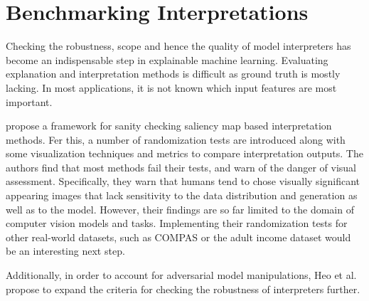 \section{Benchmarking Interpretations}
\label{sec:benchmarking}

Checking the robustness, scope and hence the quality of model interpreters has become an indispensable step in explainable machine learning. 
Evaluating explanation and interpretation methods is difficult as ground truth is mostly lacking. In most applications, it is not known which input features are most important. 


\cite{adebayo2018sanity} propose a framework for sanity checking saliency map based interpretation methods. Fer this, a number of randomization tests are introduced along with some visualization techniques and metrics to compare interpretation outputs. The authors find that most methods fail their tests, and warn of the danger of visual assessment. Specifically, they warn that humans tend to chose visually significant appearing images that lack sensitivity to the data distribution and generation as well as to the model. 
However, their findings are so far limited to the domain of computer vision models and tasks. %
Implementing their randomization tests for other real-world datasets, such as COMPAS \cite{compas_dataset} or the adult income dataset \cite{adult_income} would be an interesting next step. 

Additionally, in order to account for adversarial model manipulations, Heo et al. \cite{fooling_nn_interpreters} propose to expand the criteria for checking the robustness of interpreters further.
